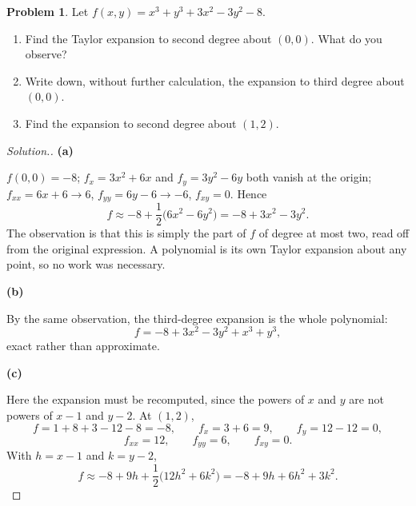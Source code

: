 \documentclass[11pt,a4paper]{article}
\theoremstyle{definition}
\newtheorem{problemx}{Problem}[subsection]
\newenvironment{problem}{\begin{problemx}}{\end{problemx}}
\newenvironment{solution}
  {\renewcommand{\qedsymbol}{}\begin{proof}[\textit{Solution}.]}
  {\end{proof}}
\newcommand{\subhead}[1]{%
  \par\medskip\noindent\textbf{#1}\par\nobreak\smallskip}
\begin{document}
\begin{problem}
Let $f(x,y) = x^3+y^3+3x^2-3y^2-8$.
\begin{enumerate}
\item[(a)] Find the Taylor expansion to second degree about $(0,0)$. What do you
observe?
\item[(b)] Write down, without further calculation, the expansion to third
degree about $(0,0)$.
\item[(c)] Find the expansion to second degree about $(1,2)$.
\end{enumerate}
\end{problem}
\begin{solution}
\subhead{(a)}
$f(0,0) = -8$; $f_x = 3x^2+6x$ and $f_y = 3y^2-6y$ both vanish at the origin;
$f_{xx} = 6x+6\rightarrow 6$, $f_{yy} = 6y-6\rightarrow -6$, $f_{xy} = 0$.
Hence
$$f \approx -8 + \frac12\big(6x^2 - 6y^2\big) = -8 + 3x^2 - 3y^2 .$$
The observation is that this is simply the part of $f$ of degree at most two,
read off from the original expression. A polynomial is its own Taylor
expansion about any point, so no work was necessary.

\subhead{(b)}
By the same observation, the third-degree expansion is the whole polynomial:
$$f = -8 + 3x^2 - 3y^2 + x^3 + y^3 ,$$
exact rather than approximate.

\subhead{(c)}
Here the expansion must be recomputed, since the powers of $x$ and $y$ are not
powers of $x-1$ and $y-2$. At $(1,2)$,
$$f = 1+8+3-12-8 = -8,\qquad f_x = 3+6 = 9,\qquad f_y = 12-12 = 0,$$
$$f_{xx} = 12,\qquad f_{yy} = 6,\qquad f_{xy} = 0 .$$
With $h = x-1$ and $k = y-2$,
$$f \approx -8 + 9h + \frac12\big(12h^2 + 6k^2\big) = -8 + 9h + 6h^2 + 3k^2 .$$
\end{solution}
\end{document}
